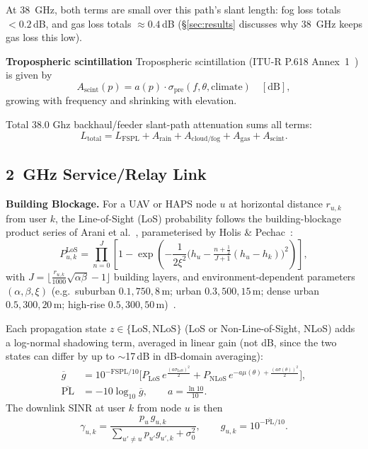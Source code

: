 \documentclass[]{ieeeaccess}
\begin{document}
 At 38~GHz, both terms are small over this path's slant length: fog loss totals $<0.2$\,dB, and gas loss totals $\approx0.4$\,dB (\S\ref{sec:results} discusses why 38~GHz keeps gas loss this low).

\textbf{ Tropospheric scintillation}
Tropospheric scintillation  (ITU-R P.618 Annex~1~\cite{itu_p618}) is given by 
\begin{equation}
A_\mathrm{scint}(p) = a(p)\cdot\sigma_\mathrm{pre}(f,\theta,\mathrm{climate}) \quad [\mathrm{dB}],
\label{eq:scint_loss}
\end{equation}
growing with frequency and shrinking with elevation.

Total 38.0 Ghz backhaul/feeder slant-path attenuation sums all terms:
\begin{equation}
L_\mathrm{total} = L_\mathrm{FSPL} + A_\mathrm{rain} + A_\mathrm{cloud/fog} + A_\mathrm{gas} + A_\mathrm{scint}.
\label{eq:feeder_loss}
\end{equation}

\subsection{2~GHz Service/Relay Link}
\label{subsec:service-model}

\textbf{Building Blockage.} For a UAV or HAPS node $u$ at horizontal distance $r_{u,k}$ from user $k$, the Line-of-Sight (LoS) probability follows the building-blockage product series of Arani et al.~\cite{arani2023}, parameterised by Holis \& Pechac~\cite{holispechac2008}:
\begin{equation}
P^\mathrm{LoS}_{u,k} = \prod_{n=0}^{J}\left[1-\exp\!\left(-\frac{1}{2\xi^2}\Big(h_u-\tfrac{n+\frac12}{J+1}(h_u-h_k)\Big)^{2}\right)\right],
\label{eq:los}
\end{equation}
with $J=\lfloor \tfrac{r_{u,k}}{1000}\sqrt{\alpha\beta}-1\rfloor$ building layers, and environment-dependent parameters $(\alpha,\beta,\xi)$ (e.g.\ suburban $0.1,750,8$\,m; urban $0.3,500,15$\,m; dense urban $0.5,300,20$\,m; high-rise $0.5,300,50$\,m)~\cite{holispechac2008}.

Each propagation state $z\in\{\mathrm{LoS,NLoS}\}$ (LoS or Non-Line-of-Sight, NLoS) adds a log-normal shadowing term, averaged in linear gain (not dB, since the two states can differ by up to $\sim$17\,dB in dB-domain averaging):
\begin{align}
\overline{g} &= 10^{-\mathrm{FSPL}/10}\Big[P_\mathrm{LoS}\,e^{\tfrac{(a\sigma_\mathrm{LoS})^2}{2}} + P_\mathrm{NLoS}\,e^{-a\mu(\theta)+\tfrac{(a\sigma(\theta))^2}{2}}\Big],\nonumber\\
\overline{\mathrm{PL}} &= -10\log_{10}\overline{g}, \qquad a=\tfrac{\ln 10}{10}.
\label{eq:pl}
\end{align}
The downlink SINR at user $k$ from node $u$ is then
\begin{equation}
\gamma_{u,k} = \frac{p_u\,g_{u,k}}{\sum_{u'\neq u} p_{u'} g_{u',k} + \sigma_0^2}, \qquad g_{u,k}=10^{-\overline{\mathrm{PL}}/10}.
\label{eq:sinr}
\end{equation}
\end{document}
